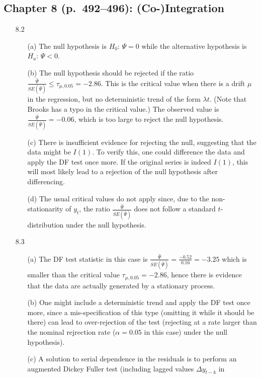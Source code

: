 \documentclass[11pt,a4paper]{article}
\begin{document}
\subsection*{Chapter 8 (p.\ 492--496): (Co-)Integration}
\begin{itemize}
\item[8.2]
\begin{enumerate}
\item[(a)] The null hypothesis is $H_0$: $\Psi = 0$ while the alternative
hypothesis is $H_a$: $\Psi < 0$.
\item[(b)] The null hypothesis should be rejected if the ratio
$
\frac{\widehat \Psi}{SE(\widehat \Psi)}
 \leq \tau_{\mu,0.05} = -2.86$. This is the
critical value when there is a drift $\mu$ in the regression, but no
deterministic trend
of the form $\lambda t$. (Note that Brooks has a typo in the critical value.) The observed value is $
\frac{\widehat \Psi}{SE(\widehat \Psi)} = -0.06$, which is too large to
reject the null hypothesis.
\item[(c)] There is insufficient evidence for rejecting the null, suggesting
that the data might be $I(1)$. To verify this, one could difference the
data and apply the DF test once more. If the original series is indeed
$I(1)$, this will most likely lead to a rejection of the null
hypothesis after differencing.
\item[(d)] The usual critical values do not apply since, due to the
non-stationarity of $y_t$, the ratio $\frac{\widehat \Psi}{SE(\widehat \Psi)}$
does not follow a standard $t$-distribution under the null hypothesis.
\end{enumerate}
\item[8.3]
\begin{enumerate}
\item[(a)] The DF test statistic in this case is
$\frac{\widehat \Psi}{SE(\widehat{\Psi})} = \frac{-0.52}{0.16} = -3.25$ which
is smaller than the critical value $\tau_{\mu,0.05} = -2.86$, hence there is
evidence that the data are actually generated by a stationary process.
\item[(b)] One might include a deterministic trend and apply the DF test once
more, since a mis-specification of this type (omitting it while it should be
there) can lead to over-rejection of the test (rejecting at a rate
larger than the nominal rejrection rate ($\alpha=0.05$ in this case)
under the null hypothesis).
\item[(c)] A solution to serial dependence in the residuals is to perform an
augmented Dickey Fuller test (including lagged values $\Delta y_{t-k}$ in

\end{enumerate}
\end{itemize}
\end{document}
